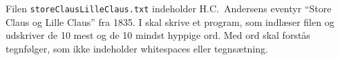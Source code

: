 Filen \lstinline!storeClausLilleClaus.txt! indeholder H.C.\ Andersens eventyr ``Store Claus og Lille Claus'' fra 1835. I skal skrive et program, som indlæser filen og udskriver de 10 mest og de 10 mindst hyppige ord. Med ord skal forstås tegnfølger, som ikke indeholder whitespaces eller tegnsætning. 